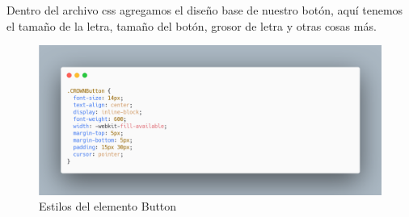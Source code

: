Dentro del archivo css agregamos el diseño base de nuestro botón, aquí tenemos el  tamaño de la letra, tamaño del botón, grosor de letra y otras cosas más.
\newline
\newline
\begin{figure}[H]
    \includegraphics[width=1\textwidth]{./Imagenes/image26.png}
    \caption[Estilos del elemento Button]{Estilos del elemento Button}
    \end{figure}
\newline
\newline
\clearpage


